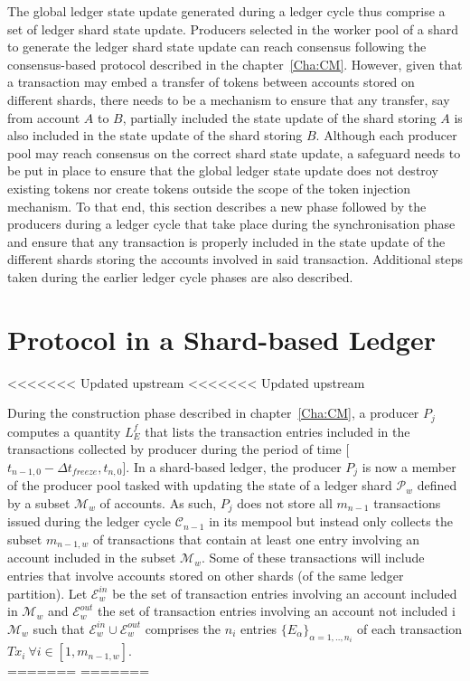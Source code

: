 The global ledger state update generated during a ledger cycle thus comprise a set of ledger shard state update. Producers selected in the worker pool of a shard to generate the ledger shard state update can reach consensus following the consensus-based protocol described in the chapter~\ref{Cha:CM}. However, given that a transaction may embed a transfer of tokens between accounts stored on different shards, there needs to be a mechanism to ensure that any transfer, say from account $A$ to $B$, partially included the state update of the shard storing $A$ is also included in the state update of the shard storing $B$. Although each producer pool may reach consensus on the correct shard state update, a safeguard needs to be put in place to ensure that the global ledger state update does not destroy existing tokens nor create tokens outside the scope of the token injection mechanism. To that end, this section describes a new phase followed by the producers during a ledger cycle that take place during the synchronisation phase and ensure that any transaction is properly included in the state update of the different shards storing the accounts involved in said transaction.  Additional steps taken during the earlier ledger cycle phases are also described.

\section{Protocol in a Shard-based Ledger}
<<<<<<< Updated upstream
<<<<<<< Updated upstream

During the construction phase described in chapter~\ref{Cha:CM}, a producer $P_j$ computes a quantity $L_E^f$ that lists the transaction entries included in the transactions collected by producer during the period of time [$t_{n-1,0} - \Delta t_{freeze}, t_{n,0}$]. In a shard-based ledger, the producer $P_j$ is now a member of the producer pool tasked with updating the state of a ledger shard $\mathcal{P}_w$ defined by a subset $\mathcal{M}_w$ of accounts. As such, $P_j$ does not store all $m_{n-1}$ transactions issued during the ledger cycle $\mathcal{C}_{n-1}$ in its mempool but instead only collects the subset $m_{n-1,w}$ of transactions that contain at least one entry involving  an account included in the subset $\mathcal{M}_w$. Some of these transactions will include entries that involve accounts stored on other shards (of the same ledger partition). Let $\mathcal{E}^{in}_w$ be the set of transaction entries involving an account included in $\mathcal{M}_w$ and $\mathcal{E}^{out}_w$ the set of transaction entries involving  an account not included i $\mathcal{M}_w$ such that $\mathcal{E}^{in}_w \cup \mathcal{E}^{out}_w$ comprises the $n_i$ entries $\{E_\alpha\}_{\alpha=1,..,n_i}$ of each transaction $Tx_i~\forall i \in  [1, m_{n-1,w}]$.\\
=======
=======

